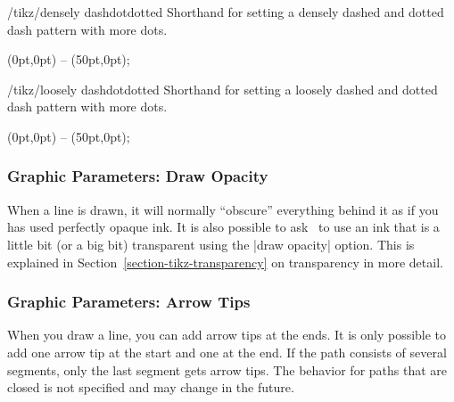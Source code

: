 \begin{stylekey}{/tikz/densely dashdotdotted}
  Shorthand for setting a densely dashed and dotted dash pattern with more dots.

\begin{codeexample}[]
\tikz {} (0pt,0pt) -- (50pt,0pt);
\end{codeexample}
\end{stylekey}

\begin{stylekey}{/tikz/loosely dashdotdotted}
  Shorthand for setting a loosely dashed and dotted dash pattern with more dots.

\begin{codeexample}[]
\tikz {} (0pt,0pt) -- (50pt,0pt);
\end{codeexample}
\end{stylekey}


\subsubsection{Graphic Parameters: Draw Opacity}

When a line is drawn, it will normally ``obscure'' everything behind
it as if you has used perfectly opaque ink. It is also possible to ask
\tikzname\ to use an ink that is a little bit (or a big bit)
transparent using the |draw opacity| option. This is explained in
Section~\ref{section-tikz-transparency} on transparency in more detail.



\subsubsection{Graphic Parameters: Arrow Tips}

When you draw a line, you can add arrow tips at the ends. It is
only possible to add one arrow tip at the start and one at the end. If
the path consists of several segments, only the last segment gets
arrow tips. The behavior for paths that are closed is not specified
and may change in the future.

